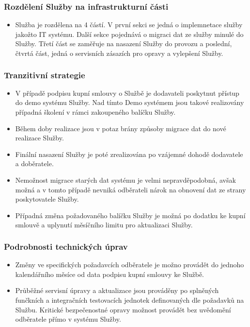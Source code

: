 \documentclass[11pt, a4paper, titlepage]{article}
\begin{document}
	\subsubsection*{Rozdělení Služby na infrastrukturní části}

	\begin{itemize}
		\item Služba je rozdělena na 4 částí. V první sekci se jedná o implemnetace služby jakožto IT systému. Další sekce pojednává o migraci dat ze služby minulé do Služby. Třetí část se zaměřuje na nasazení Služby do provozu a poslední, čtvrtá část, jedná o servisních zásazích pro opravy a vylepšení Služby.
	\end{itemize}

	\subsubsection*{Tranzitivní strategie}

	\begin{itemize}
		\item V případě podpisu kupní smlouvy o Službě je dodavateli poskytnut přístup do demo systému Služby. Nad tímto Demo systémem jsou takové realizovány případná školení v rámci zakoupeného balíčku Služby.
		\item Během doby realizace jsou v potaz brány způsoby migrace dat do nové realizace Služby.
		\item Finální nasazení Služby je poté zrealizována po vzájemné dohodě dodavatele a doběratele.
		\item Nemožnost migrace starých dat systému je velmi nepravděpodobná, avšak možná a v tomto případě nevniká odběrateli nárok na obnovení dat ze strany poskytovatele Služby.
		\item Případná změna požadovaného balíčku Služby je možná po dodatku ke kupní smlouvě a uplynutí měsíčního limitu pro aktualizaci Služby.
	\end{itemize}

	\subsubsection*{Podrobnosti technických úprav}

	\begin{itemize}
		\item Změny ve specifických požadavcích odběratele je možno provádět do jednoho kalendářního měsíce od data podpisu kupní smlouvy ke Službě.
		\item Průběžné servisní úpravy a aktualizace jsou prováděny po splněných funčkních a integračních testovacích jednotek definovaných dle požadavků na Službu. Kritické bezpečenostné opravy možnost provádět bez uvědomění odběratele přímo v systému Služby. 
	\end{itemize}
\end{document}
